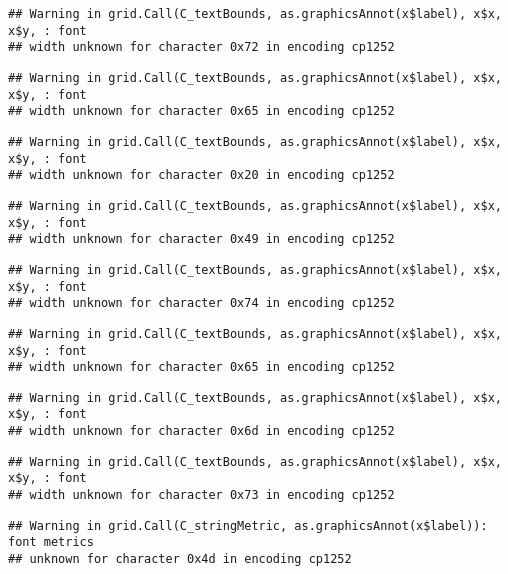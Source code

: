 \documentclass[
]{article}
\begin{document}
\begin{verbatim}
## Warning in grid.Call(C_textBounds, as.graphicsAnnot(x$label), x$x, x$y, : font
## width unknown for character 0x72 in encoding cp1252
\end{verbatim}

\begin{verbatim}
## Warning in grid.Call(C_textBounds, as.graphicsAnnot(x$label), x$x, x$y, : font
## width unknown for character 0x65 in encoding cp1252
\end{verbatim}

\begin{verbatim}
## Warning in grid.Call(C_textBounds, as.graphicsAnnot(x$label), x$x, x$y, : font
## width unknown for character 0x20 in encoding cp1252
\end{verbatim}

\begin{verbatim}
## Warning in grid.Call(C_textBounds, as.graphicsAnnot(x$label), x$x, x$y, : font
## width unknown for character 0x49 in encoding cp1252
\end{verbatim}

\begin{verbatim}
## Warning in grid.Call(C_textBounds, as.graphicsAnnot(x$label), x$x, x$y, : font
## width unknown for character 0x74 in encoding cp1252
\end{verbatim}

\begin{verbatim}
## Warning in grid.Call(C_textBounds, as.graphicsAnnot(x$label), x$x, x$y, : font
## width unknown for character 0x65 in encoding cp1252
\end{verbatim}

\begin{verbatim}
## Warning in grid.Call(C_textBounds, as.graphicsAnnot(x$label), x$x, x$y, : font
## width unknown for character 0x6d in encoding cp1252
\end{verbatim}

\begin{verbatim}
## Warning in grid.Call(C_textBounds, as.graphicsAnnot(x$label), x$x, x$y, : font
## width unknown for character 0x73 in encoding cp1252
\end{verbatim}

\begin{verbatim}
## Warning in grid.Call(C_stringMetric, as.graphicsAnnot(x$label)): font metrics
## unknown for character 0x4d in encoding cp1252
\end{verbatim}
\end{document}
